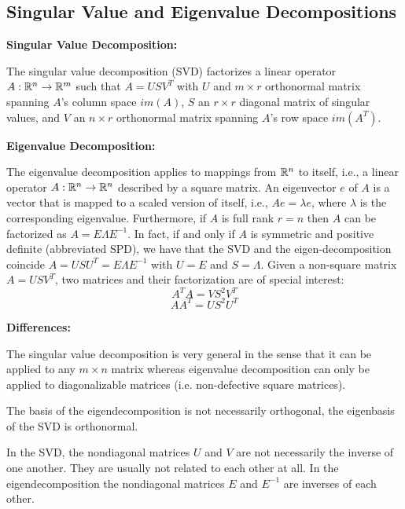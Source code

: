 \documentclass[12pt]{article}
\begin{document}
\subsection{Singular Value and Eigenvalue Decompositions}
\par \textbf{Singular Value Decomposition:}
\par The singular value decomposition (SVD) factorizes a linear operator $A: \mathbb{R}^n \rightarrow \mathbb{R}^m $ such that $A = USV^T$ with $U$ and $m\times r$ orthonormal matrix spanning $A$'s column space $im(A)$, $S$ an $r\times r$ diagonal matrix of singular values, and $V$ an $n\times r$ orthonormal matrix spanning $A$'s row space $im(A^T)$.
\par \textbf{Eigenvalue Decomposition:}
\par The eigenvalue decomposition applies to mappings from $\mathbb{R}^n$ to itself, i.e., a linear operator $A: \mathbb{R}^n \rightarrow \mathbb{R}^n $ described by a square matrix. An eigenvector $e$ of $A$ is a vector that is mapped to a scaled version of itself, i.e., $Ae = \lambda e$, where $\lambda$ is the corresponding eigenvalue. Furthermore, if $A$ is full rank $r=n$ then $A$ can be factorized as $A = E\Lambda E^{-1}$.  In fact, if and only if $A$ is symmetric and positive definite (abbreviated SPD), we have that the SVD and the eigen-decomposition coincide $A = USU^T = E\Lambda E^{-1}$ with $U=E$ and $S=\Lambda$. Given a non-square matrix $A=USV^T$, two matrices and their factorization are of special interest:
\[ A^TA = VS^2V^T \]
\[ AA^T = US^2U^T \]
\par \textbf{Differences:}
\ulb
\item The singular value decomposition is very general in the sense that it can be applied to any $m\times n$ matrix whereas eigenvalue decomposition can only be applied to diagonalizable matrices (i.e. non-defective square matrices).
\item The basis of the eigendecomposition is not necessarily orthogonal, the eigenbasis of the SVD is orthonormal.
\item In the SVD, the nondiagonal matrices $U$ and $V$ are not necessarily the inverse of one another. They are usually not related to each other at all. In the eigendecomposition the nondiagonal matrices $E$ and $E^{-1}$ are inverses of each other.
\ule
\end{document}
